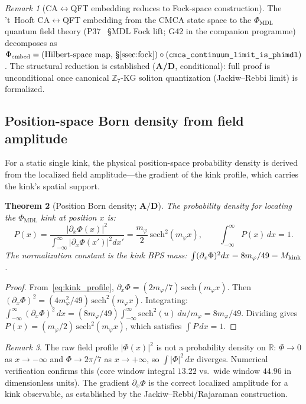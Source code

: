 \documentclass[11pt]{article}
\newtheorem{theorem}{Theorem}[section]
\theoremstyle{remark}
\newtheorem{remark}[theorem]{Remark}
\newcommand{\PHIMDL}{\Phi_{\mathrm{MDL}}}
\newcommand{\Mkink}{M_{\rm kink}}
\newcommand{\CatAD}{\textbf{A/D}}
\begin{document}
\begin{remark}[CA$\leftrightarrow$QFT embedding reduces to Fock-space construction]
The 't~Hooft CA$\leftrightarrow$QFT embedding from the CMCA state space to the
$\PHIMDL$ quantum field theory (P37~\cite{SpivackQMFromR110} §MDL Fock lift;
G42 in the companion programme) decomposes as
$\Phi_{\rm embed} = (\text{Hilbert-space map, §\ref{ssec:fock}}) \circ
(\texttt{cmca\_continuum\_limit\_is\_phimdl})$.
The structural reduction is established (\CatAD, conditional): full proof is
unconditional once canonical $\mathbb{Z}_7$-KG soliton quantization (Jackiw--Rebbi
limit) is formalized.
\end{remark}

\subsection{Position-space Born density from field amplitude}
\label{ssec:position_born}

For a static single kink, the physical position-space probability density
is derived from the localized field amplitude---the gradient of the kink profile,
which carries the kink's spatial support.

\begin{theorem}[Position Born density; $\CatAD$]
  \label{thm:position_born}
  The probability density for locating the $\PHIMDL$ kink at position $x$ is:
  \begin{equation}
    P(x) = \frac{\bigl|\partial_x\Phi(x)\bigr|^2}
                {\displaystyle\int_{-\infty}^{\infty}\bigl|\partial_x\Phi(x')\bigr|^2 dx'}
    = \frac{m_\varphi}{2}\,\mathrm{sech}^2(m_\varphi x),
    \qquad \int_{-\infty}^{\infty}P(x)\,dx = 1.
    \label{eq:born_density}
  \end{equation}
  The normalization constant is the kink BPS mass:
  $\int(\partial_x\Phi)^2 dx = 8m_\varphi/49 = \Mkink$.
\end{theorem}
\begin{proof}
  From~\eqref{eq:kink_profile}, $\partial_x\Phi = (2m_\varphi/7)\,\mathrm{sech}(m_\varphi x)$.
  Then $(\partial_x\Phi)^2 = (4m_\varphi^2/49)\,\mathrm{sech}^2(m_\varphi x)$.
  Integrating: $\int_{-\infty}^{\infty}(\partial_x\Phi)^2\,dx = (8m_\varphi/49)\int_{-\infty}^{\infty}\mathrm{sech}^2(u)\,du/m_\varphi = 8m_\varphi/49$.
  Dividing gives $P(x) = (m_\varphi/2)\,\mathrm{sech}^2(m_\varphi x)$, which
  satisfies $\int P\,dx = 1$.
\end{proof}

\begin{remark}
  The raw field profile $|\Phi(x)|^2$ is not a probability density on $\mathbb{R}$:
  $\Phi\to 0$ as $x\to-\infty$ and $\Phi\to 2\pi/7$ as $x\to+\infty$, so
  $\int|\Phi|^2\,dx$ diverges.  Numerical verification confirms this
  (core window integral $13.22$ vs.\ wide window $44.96$ in dimensionless units).
  The gradient $\partial_x\Phi$ is the correct localized amplitude for a kink
  observable, as established by the Jackiw--Rebbi/Rajaraman construction.
\end{remark}
\end{document}
